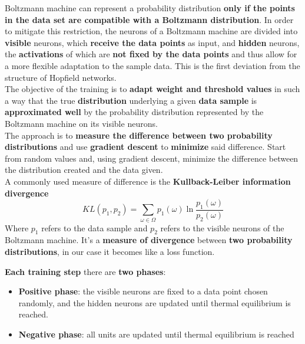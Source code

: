 \documentclass[11pt]{article}
\begin{document}
		Boltzmann machine can represent a probability distribution \textbf{only if the points in the data set are compatible with a Boltzmann distribution}. In order to mitigate this restriction, the neurons of a Boltzmann machine are divided into \textbf{visible} neurons, which \textbf{receive the data points} as input, and \textbf{hidden} neurons, the \textbf{activations} of which are \textbf{not fixed by the data points} and thus allow for a more flexible adaptation to the sample data. This is the first deviation from the structure of Hopfield networks.\\
		
		The objective of the training is to \textbf{adapt weight and threshold values} in such a way that the true \textbf{distribution} underlying a given \textbf{data sample} is \textbf{approximated well} by the probability distribution represented by the Boltzmann machine on its visible neurons.\\
		
		The approach is to \textbf{measure the difference between two probability distributions} and use \textbf{gradient descent} to \textbf{minimize} said difference. Start from random values and, using gradient descent, minimize the difference between the distribution created and the data given.\\
		
		A commonly used measure of difference is the \textbf{Kullback-Leiber information divergence}
		$$ KL(p_1, p_2) = \sum_{\omega \in \Omega} p_1 (\omega) \ln \frac{p_1(\omega)}{p_2 (\omega)} $$
		Where $p_1$ refers to the data sample and $p_2$ refers to the visible neurons of the Boltzmann machine. It's a \textbf{measure of divergence} between \textbf{two probability distributions}, in our case it becomes like a loss function.\\
		
		\newpage
		
		\textbf{Each training step} there are \textbf{two phases}:
		\begin{itemize}
			\item \textbf{Positive phase}: the visible neurons are fixed to a data point chosen randomly, and the hidden neurons are updated until thermal equilibrium is reached.\\
			
			\item \textbf{Negative phase}: all units are updated until thermal equilibrium is reached
		\end{itemize}
		
\end{document}
